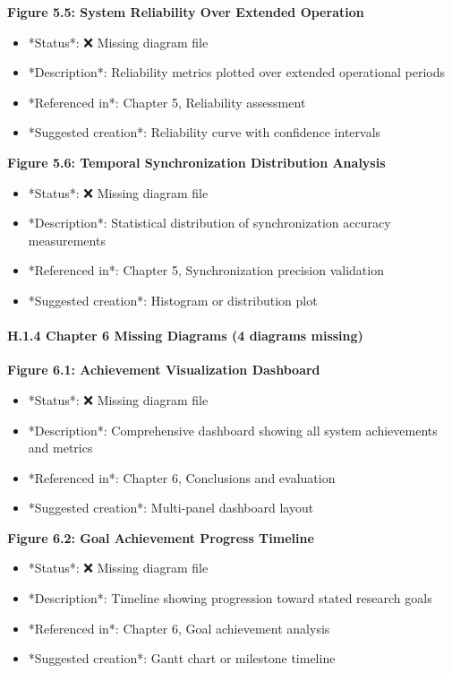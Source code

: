 \documentclass[12pt,a4paper]{article}
\begin{document}
{{\begin{itemize}
\end{itemize}
\textbf{Figure 5.5: System Reliability Over Extended Operation}

\begin{itemize}
\item *Status*: ❌ Missing diagram file
\item *Description*: Reliability metrics plotted over extended operational periods
\item *Referenced in*: Chapter 5, Reliability assessment
\item *Suggested creation*: Reliability curve with confidence intervals

\end{itemize}
\textbf{Figure 5.6: Temporal Synchronization Distribution Analysis}

\begin{itemize}
\item *Status*: ❌ Missing diagram file
\item *Description*: Statistical distribution of synchronization accuracy measurements
\item *Referenced in*: Chapter 5, Synchronization precision validation
\item *Suggested creation*: Histogram or distribution plot

\end{itemize}
\paragraph{H.1.4 Chapter 6 Missing Diagrams (4 diagrams missing)}

\textbf{Figure 6.1: Achievement Visualization Dashboard}

\begin{itemize}
\item *Status*: ❌ Missing diagram file
\item *Description*: Comprehensive dashboard showing all system achievements and metrics
\item *Referenced in*: Chapter 6, Conclusions and evaluation
\item *Suggested creation*: Multi-panel dashboard layout

\end{itemize}
\textbf{Figure 6.2: Goal Achievement Progress Timeline}

\begin{itemize}
\item *Status*: ❌ Missing diagram file
\item *Description*: Timeline showing progression toward stated research goals
\item *Referenced in*: Chapter 6, Goal achievement analysis
\item *Suggested creation*: Gantt chart or milestone timeline


\end{itemize}}}
\end{document}
